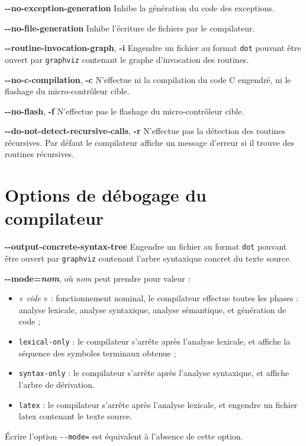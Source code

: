 
\textbf{-{}-no-exception-generation} Inhibe la génération du code des exceptions.



\textbf{-{}-no-file-generation} Inhibe l'écriture de fichiers par le compilateur.


\textbf{-{}-routine-invocation-graph}, \textbf{-i} Engendre un fichier au format \texttt{dot} pouvant être ouvert par \texttt{graphviz} contenant le graphe d'invocation des routines.

\textbf{-{}-no-c-compilation}, \textbf{-c} N'effectue ni la compilation du code C engendré, ni le flashage du micro-contrôleur cible.


\textbf{-{}-no-flash}, \textbf{-f} N'effectue pas le flashage du micro-contrôleur cible.


\textbf{-{}-do-not-detect-recursive-calls}, \textbf{-r} N'effectue pas la détection des routines récursives. Par défaut le compilateur affiche un message d'erreur si il trouve des routines récursives.






\section{Options de débogage du compilateur}


\textbf{-{}-output-concrete-syntax-tree} Engendre un fichier au format \texttt{dot} pouvant être ouvert par \texttt{graphviz} contenant l'arbre syntaxique concret du texte source.


\textbf{-{}-mode=\emph{nom}}, où \emph{nom} peut prendre pour valeur :
\begin{itemize}
  \item « \emph{vide} » : fonctionnement nominal, le compilateur effectue toutes les phases : analyse lexicale, analyse syntaxique, analyse sémantique, et génération de code ;
  \item \texttt{lexical-only} : le compilateur s'arrête après l'analyse lexicale, et affiche la séquence des symboles terminaux obtenue ;
  \item \texttt{syntax-only} : le compilateur s'arrête après l'analyse syntaxique, et affiche l'arbre de dérivation.
  \item \texttt{latex} : le compilateur s'arrête après l'analyse lexicale, et engendre un fichier latex contenant le texte source.
\end{itemize}

Écrire l'option \texttt{-{}-mode=} est équivalent à l'absence de cette option.
